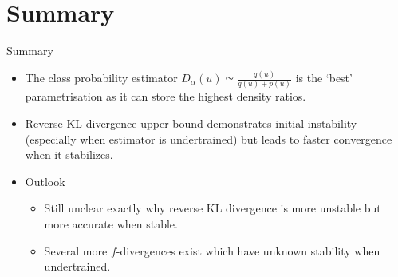 \documentclass[handout]{beamer}
\begin{document}
\section*{Summary}

\begin{frame}{Summary}
  \begin{itemize}
  \item
    The class probability estimator $D_\alpha(u)\simeq\frac{q(u)}{q(u)+p(u)}$ is the `best' parametrisation as it can store the \alert{highest density ratios}.
  \item
    Reverse KL divergence upper bound demonstrates \alert{initial instability} (especially when estimator is undertrained) but leads to \alert{faster convergence} when it stabilizes.
  \end{itemize}
  
  \begin{itemize}
  \item
    Outlook
    \begin{itemize}
    \item
      Still unclear exactly why reverse KL divergence is more unstable but more accurate when stable.
    \item
      Several more $f$-divergences exist which have unknown stability when undertrained.
    \end{itemize}
  \end{itemize}
\end{frame}



%
%    
%    
%
% 
%    
%
\end{document}
